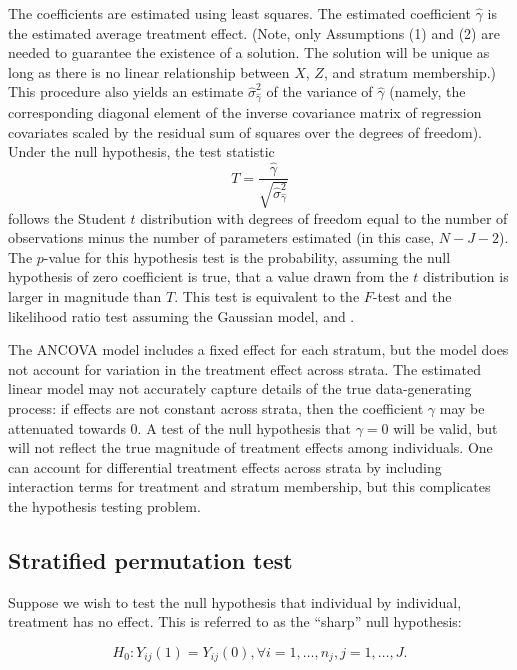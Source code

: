 \documentclass[12pt]{article}
\newcommand{\todo}[1]{{\color{red}{TO DO: \sc #1}}}
\begin{document}
\todo{are the estimator, standard error, variance clear here?}
The coefficients are estimated using least squares.
The estimated coefficient $\hat{\gamma}$ is the estimated average treatment effect. 
(Note, only Assumptions (1) and (2) are needed to guarantee the existence of a solution.
The solution will be unique as long as there is no linear relationship between $X$, $Z$, and stratum membership.)
This procedure also yields an estimate $\hat{\sigma}_{\hat{\gamma}}^2$ of the variance of $\hat{\gamma}$
(namely, the corresponding diagonal element of the inverse covariance matrix of regression covariates scaled by the residual sum of squares over the degrees of freedom).
Under the null hypothesis, the test statistic 
$$ T = \frac{\hat{\gamma}}{\sqrt{ \hat{\sigma}_{\hat{\gamma}}^2}}$$
follows the Student $t$ distribution with degrees of freedom equal to the number of observations minus the number of parameters estimated (in this case, $N - J - 2$).
The $p$-value for this hypothesis test is the probability, assuming the null hypothesis of zero coefficient is true, that a value drawn from the $t$ distribution is larger in magnitude than $T$.
This test is equivalent to the $F$-test and the likelihood ratio test assuming the Gaussian model,
and \todo{ cite this? is therefore locally most powerful ????}.


The ANCOVA model includes a fixed effect for each stratum, but 
the model does not account for variation in the treatment effect across strata.  
The estimated linear model may not accurately capture details of the true data-generating process:
if effects are not constant across strata, then the coefficient $\gamma$ may be attenuated towards 0.
A test of the null hypothesis that $\gamma = 0$ will be valid, but will not reflect the true magnitude of treatment effects among individuals.
One can account for differential treatment effects across strata by including interaction terms for treatment and stratum membership, but this complicates the hypothesis testing problem. 


\subsection{Stratified permutation test}\label{subsec:strat_perm_test}
Suppose we wish to test the null hypothesis that individual by individual, treatment has no effect.
This is referred to as the ``sharp'' null hypothesis:

$$H_0: Y_{ij}(1) = Y_{ij}(0), \forall i = 1, \dots, n_j, j = 1,\dots, J.$$
\end{document}
